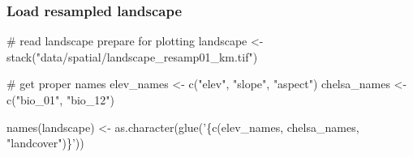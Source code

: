 \documentclass[]{article}
\newenvironment{Shaded}{}{}
\newcommand{\CommentTok}[1]{\textcolor[rgb]{0.00,0.50,0.00}{#1}}
\newcommand{\KeywordTok}[1]{\textcolor[rgb]{0.00,0.00,1.00}{#1}}
\newcommand{\NormalTok}[1]{#1}
\newcommand{\StringTok}[1]{\textcolor[rgb]{0.00,0.50,0.50}{#1}}
\begin{document}
\hypertarget{load-resampled-landscape}{%
\subsubsection{Load resampled landscape}\label{load-resampled-landscape}}

\begin{Shaded}
\begin{Highlighting}[]
\CommentTok{# read landscape prepare for plotting}
\NormalTok{landscape <-}\StringTok{ }\KeywordTok{stack}\NormalTok{(}\StringTok{"data/spatial/landscape_resamp01_km.tif"}\NormalTok{)}

\CommentTok{# get proper names}
\NormalTok{elev_names <-}\StringTok{ }\KeywordTok{c}\NormalTok{(}\StringTok{"elev"}\NormalTok{, }\StringTok{"slope"}\NormalTok{, }\StringTok{"aspect"}\NormalTok{)}
\NormalTok{chelsa_names <-}\StringTok{ }\KeywordTok{c}\NormalTok{(}\StringTok{"bio_01"}\NormalTok{, }\StringTok{"bio_12"}\NormalTok{)}

\KeywordTok{names}\NormalTok{(landscape) <-}\StringTok{ }\KeywordTok{as.character}\NormalTok{(}\KeywordTok{glue}\NormalTok{(}\StringTok{'\{c(elev_names, chelsa_names, "landcover")\}'}\NormalTok{))}
\end{Highlighting}
\end{Shaded}
\end{document}
